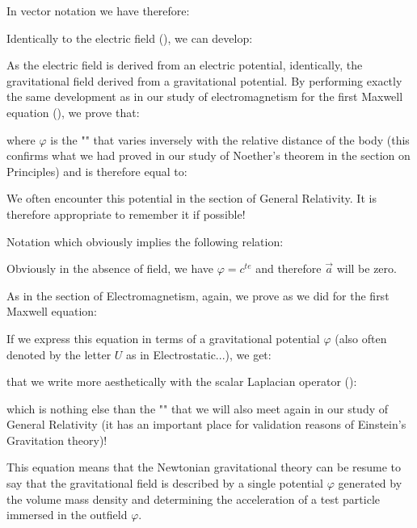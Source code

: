 	In vector notation we have therefore:
	
	Identically to the electric field (), we can develop:
	
	As the electric field is derived from an electric potential, identically, the gravitational field derived from a gravitational potential\label{gravitation potential}. By performing exactly the same development as in  our study of electromagnetism for the first Maxwell equation (), we prove that:
	
	where $\varphi$ is the "" that varies inversely with the relative distance of the body (this confirms what we had proved in our study of Noether's theorem in the section on Principles) and is therefore equal to:
	
	\begin{tcolorbox}[title=Remark,colframe=black,arc=10pt]
	We often encounter this potential in the section of General Relativity. It is therefore appropriate to remember it if possible!
	\end{tcolorbox}	
	Notation which obviously implies the following relation:
	
	\begin{tcolorbox}[title=Remark,colframe=black,arc=10pt]
	Obviously in the absence of field, we have $\varphi=c^{te}$ and therefore $\vec{a}$  will be zero.
	\end{tcolorbox}
	As in the section of Electromagnetism, again, we prove as we did for the first Maxwell equation:
	
	If we express this equation in terms of a gravitational potential $\varphi$ (also often denoted by the letter $U$ as in Electrostatic...), we get:
	
	that we write more aesthetically with the scalar Laplacian operator ():
	
	which is nothing else than the "\label{newton-poisson equation}" that we will  also meet again in our study of General Relativity (it has an important place for validation reasons of Einstein's Gravitation theory)!
	
	This equation means that the Newtonian gravitational theory can be resume to say that the gravitational field is described by a single potential $\varphi$ generated by the volume mass density and determining the acceleration of a test particle immersed in the outfield $\varphi$.
	
